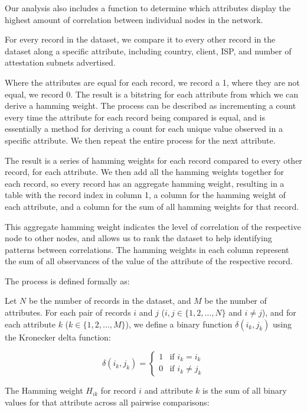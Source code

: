 \documentclass[conference]{IEEEtran}
\begin{document}
Our analysis also includes a function to determine which attributes display the highest amount of correlation between individual nodes in the network.

For every record in the dataset, we compare it to every other record in the dataset along a specific attribute, including country, client, ISP, and number of attestation subnets advertised.

Where the attributes are equal for each record, we record a 1, where they are not equal, we record 0.
The result is a bitstring for each attribute from which we can derive a hamming weight.
The process can be described as incrementing a count every time the attribute for each record being compared is equal, and is essentially a method for deriving a count for each unique value observed in a specific attribute. We then repeat the entire process for the next attribute.

The result is a series of hamming weights for each record compared to every other record, for each attribute. We then add all the hamming weights together for each record, so every record has an aggregate hamming weight, resulting in a table with the record index in column 1, a column for the hamming weight of each attribute, and a column for the sum of all hamming weights for that record.

This aggregate hamming weight indicates the level of correlation of the respective node to other nodes, and allows us to rank the dataset to help identifying patterns between correlations. The hamming weights in each column represent the sum of all observances of the value of the attribute of the respective record.

The process is defined formally as:

Let \( N \) be the number of records in the dataset, and \( M \) be the number of attributes.  For each pair of records \( i \) and \( j \) (\( i, j \in \{1, 2, \ldots, N\} \) and \( i \neq j \)), and for each attribute \( k \) (\( k \in \{1, 2, \ldots, M\} \)), we define a binary function \( \delta \left( i_k,j_k \right) \) using the Kronecker delta function:

\[
\delta \left( i_k,j_k \right) = \begin{cases} 1 & \text{if } i_k = i_k \\ 0 & \text{if } i_k \neq j_k \end{cases}
\]

The Hamming weight \( H_{ik} \) for record \( i \) and attribute \( k \) is the sum of all binary values for that attribute across all pairwise comparisons:
\end{document}
